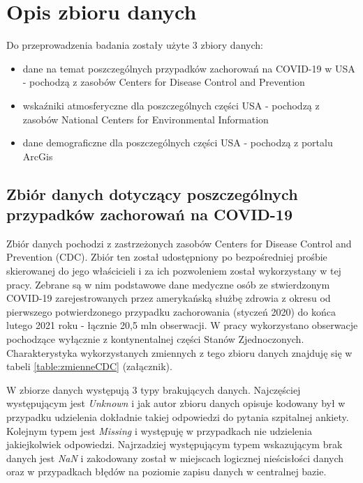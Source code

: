 \documentclass[polish, twoside, 12pt, a4paper]{article}
\theoremstyle{definition}
\theoremstyle{plain}
\theoremstyle{remark}
\begin{document}
\clearpage
\section{Opis zbioru danych}
\label{chapter:data-set}


Do przeprowadzenia badania zostały użyte 3 zbiory danych: 
\begin{itemize}
  \item dane na temat poszczególnych przypadków zachorowań na COVID-19 w USA - pochodzą z zasobów Centers for Disease Control and Prevention
  \item wskaźniki atmosferyczne dla poszczególnych części USA - pochodzą z zasobów National Centers for Environmental Information
  \item dane demograficzne  dla poszczególnych części USA - pochodzą z portalu ArcGis
\end{itemize}

\subsection{Zbiór danych dotyczący poszczególnych przypadków zachorowań na COVID-19}

Zbiór danych pochodzi z zastrzeżonych zasobów Centers for Disease Control and Prevention (CDC). Zbiór ten został udostępniony po bezpośredniej prośbie skierowanej do jego właścicieli i za ich pozwoleniem został wykorzystany w tej pracy. Zebrane są w nim podstawowe dane medyczne osób ze stwierdzonym COVID-19 zarejestrowanych przez amerykańską służbę zdrowia z okresu od pierwszego potwierdzonego przypadku zachorowania (styczeń 2020) do końca lutego 2021 roku - łącznie 20,5 mln obserwacji. W pracy wykorzystano obserwacje pochodzące wyłącznie z kontynentalnej części Stanów Zjednoczonych. Charakterystyka wykorzystanych zmiennych z tego zbioru danych znajduję się w tabeli \ref{table:zmienneCDC} (załącznik).

W zbiorze danych występują 3 typy brakujących danych. Najczęściej występującym jest \emph{Unknown} i jak autor zbioru danych opisuje kodowany był w przypadku udzielenia dokładnie takiej odpowiedzi do pytania szpitalnej ankiety. Kolejnym typem jest  \emph{Missing} i występuję w przypadkach nie udzielenia jakiejkolwiek odpowiedzi. Najrzadziej występującym typem wskazującym brak danych jest \emph{NaN} i zakodowany został w miejscach logicznej nieścisłości danych oraz w przypadkach błędów na poziomie zapisu danych w centralnej bazie.
\end{document}
